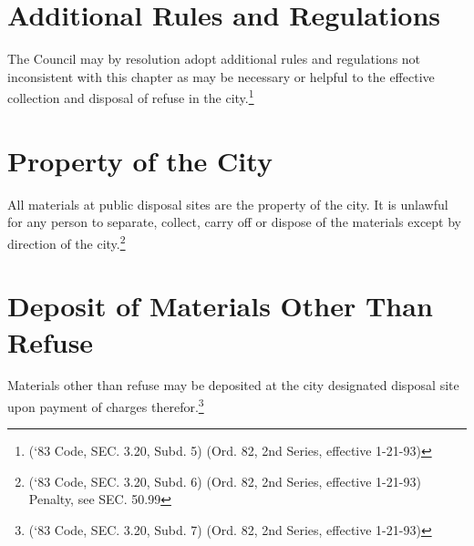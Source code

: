 \section{Additional Rules and Regulations}
The Council may by resolution adopt additional rules and regulations not inconsistent with this chapter as may be necessary or helpful to the effective collection and disposal of refuse in the city.\footnote{(‘83 Code, SEC. 3.20, Subd. 5) (Ord. 82, 2nd Series, effective 1-21-93)}

\section{Property of the City}
All materials at public disposal sites are the property of the city.  It is unlawful for any person to separate, collect, carry off or dispose of the materials except by direction of the city.\footnote{(‘83 Code, SEC. 3.20, Subd. 6) (Ord. 82, 2nd Series, effective 1-21-93) Penalty, see SEC. 50.99}

\section{Deposit of Materials Other Than Refuse}
Materials other than refuse may be deposited at the city designated disposal site upon payment of charges therefor.\footnote{(‘83 Code, SEC. 3.20, Subd. 7) (Ord. 82, 2nd Series, effective 1-21-93)}
